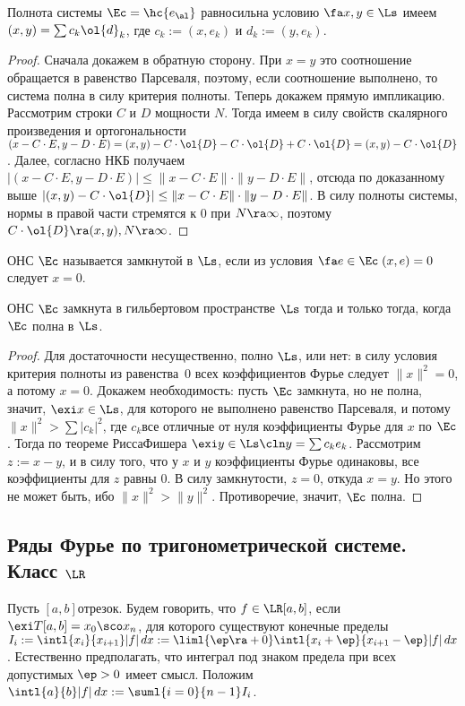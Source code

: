 \documentclass[a4paper]{article}
\newcommand{\intlab}{\intl{a}{b}}
\begin{document}
\begin{theorem}
Полнота системы $\Ec = \hc{e_\al}$ равносильна условию $\fa x, y \in \Ls$ имеем
$(x,y) = \sum c_k \ol{d}_k$, где $c_k := (x,e_k)$ и $d_k := (y,e_k)$.
\end{theorem}
\begin{proof}
Сначала докажем в обратную сторону. При $x = y$ это соотношение обращается в равенство Парсеваля,
поэтому, если соотношение выполнено, то система полна в силу критерия полноты. Теперь докажем
прямую импликацию. Рассмотрим строки $C$ и $D$ мощности $N$. Тогда
имеем в силу свойств скалярного произведения и ортогональности
$(x - C \cdot E, y - D \cdot E) = (x,y) - C \cdot \ol{D} - C \cdot \ol{D} + C \cdot \ol{D} = (x,y) - C\cdot \ol{D}$.
Далее, согласно НКБ получаем $|(x - C\cdot E, y - D \cdot E)| \le \|x- C\cdot E\|\cdot\|y - D\cdot E\|$,
отсюда по доказанному выше $|(x,y) - C \cdot \ol{D}| \le \|x- C\cdot E\|\cdot\|y - D\cdot E\|$.
В силу полноты системы, нормы в правой части стремятся к 0 при $N \ra \infty$,
поэтому $C \cdot \ol{D} \ra (x,y), N \ra \infty$.
\end{proof}

ОНС $\Ec$ называется замкнутой в $\Ls$, если из условия $\fa e \in \Ec \; (x,e) = 0$ следует $x = 0$.

\begin{theorem}
ОНС $\Ec$ замкнута в гильбертовом пространстве $\Ls$ тогда и только тогда, когда $\Ec$ полна в $\Ls$.
\end{theorem}
\begin{proof}
Для достаточности несущественно, полно $\Ls$, или нет: в силу условия  критерия полноты из равенства~0
всех коэффициентов Фурье следует $\|x\|^2 = 0$, а потому $x = 0$. Докажем необходимость: пусть $\Ec$ замкнута,
но не полна, значит, $\exi x \in \Ls$, для которого не выполнено равенство Парсеваля, и потому
$\|x\|^2 > \sum |c_k|^2$, где $c_k$\т все отличные от нуля коэффициенты Фурье для $x$ по $\Ec$.
Тогда по теореме Рисса\ч Фишера $\exi y \in \Ls\cln y = \sum c_k e_k$. Рассмотрим $z := x - y$, и в силу того, что
у $x$ и $y$ коэффициенты Фурье одинаковы, все коэффициенты для $z$ равны 0. В силу замкнутости, $z = 0$, откуда $x = y$.
Но этого не может быть, ибо $\|x\|^2 > \|y\|^2$. Противоречие, значит, $\Ec$ полна.
\end{proof}

\subsection{Ряды Фурье по тригонометрической системе. Класс $\LR$}
Пусть $[a,b]$\т отрезок. Будем говорить, что $f \in\LR[a,b]$, если $\exi T[a,b] = x_0\sco x_n$,
для которого существуют конечные пределы $I_i := \intl{x_i}{x_{i+1}}|f|\,d x := \liml{\ep \ra
+0}\intl{x_i+\ep}{x_{i+1}-\ep}|f|\,d x$. Естественно предполагать, что интеграл под знаком предела
при всех допустимых $\ep > 0$ имеет смысл. Положим $\intlab |f|\,d x := \suml{i=0}{n-1} I_i$.
\end{document}
